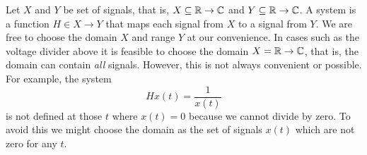 \begin{test}


\end{test}




Let $X$ and $Y$ be set of signals, that is, $X \subseteq {\mathbb R} \to {\mathbb C}$ and $Y \subseteq {\mathbb R} \to {\mathbb C}$.  A system is a function $H \in X \to Y$ that maps each signal from $X$ to a signal from $Y$.  We are free to choose the domain $X$ and range $Y$ at our convenience.  In cases such as the voltage divider above it is feasible to choose the domain $X = {\mathbb R} \to {\mathbb C}$, that is, the domain can contain \emph{all} signals.  However, this is not always convenient or possible.  For example, the system
\[
Hx(t) = \frac{1}{x(t)}
\]
is not defined at those $t$ where $x(t) = 0$ because we cannot divide by zero.  To avoid this we might choose the domain as the set of signals $x(t)$ which are not zero for any $t$.   

